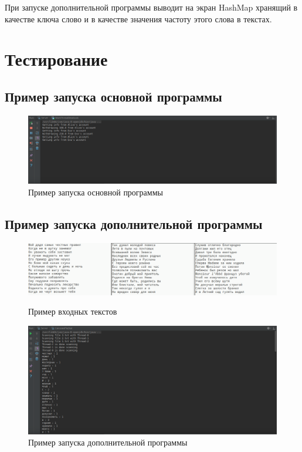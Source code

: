 \documentclass{article}
\begin{document}
При запуске дополнительной программы выводит на экран HashMap хранящий в качестве ключа слово и в качестве значения частоту этого слова в текстах.

\section{Тестирование}

\subsection{Пример запуска основной программы}
\begin{figure}[H]
	\begin{flushleft}
		\centerline{\includegraphics[scale=0.55]{lab9_main.png}}
		\caption{Пример запуска основной программы}
	\end{flushleft}
\end{figure}
\vspace{3cm}

\subsection{Пример запуска дополнительной программы}
\begin{figure}[H]
	\begin{flushleft}
		\centerline{\includegraphics[scale=0.55]{example.png}}
		\caption{Пример входных текстов}
        \vspace{3cm}
        \centerline{\includegraphics[scale=0.55]{lab9_add.png}}
		\caption{Пример запуска дополнительной программы}
	\end{flushleft}
\end{figure}
\end{document}
